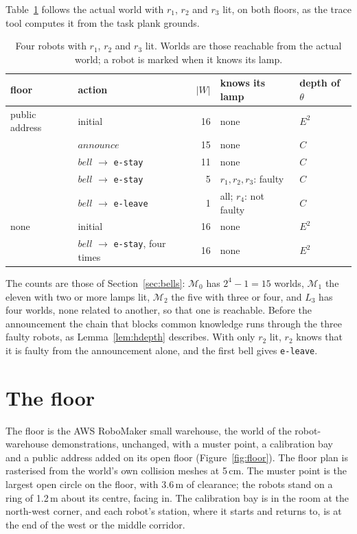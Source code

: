 \documentclass[11pt,a4paper]{article}
\theoremstyle{definition}
\newcommand{\Mod}{\mathcal{M}}
\newcommand{\code}[1]{\texttt{\small #1}}
\newcommand{\some}{\theta}
\begin{document}
Table~\ref{tab:trace} follows the actual world with $r_1$, $r_2$ and $r_3$ lit,
on both floors, as the trace tool computes it from the task plank grounds.

\begin{table}[H]
\centering\small
\caption{Four robots with $r_1$, $r_2$ and $r_3$ lit. Worlds are those
reachable from the actual world; a robot is marked when it knows its lamp.}
\label{tab:trace}
\begin{tabular}{@{}l l r l l@{}}
\toprule
floor & action & $|W|$ & knows its lamp & depth of $\some$ \\
\midrule
public address & initial & 16 & none & $E^2$ \\
 & $\mathit{announce}$ & 15 & none & $C$ \\
 & $\mathit{bell}$ $\to$ \code{e-stay} & 11 & none & $C$ \\
 & $\mathit{bell}$ $\to$ \code{e-stay} & 5 & $r_1, r_2, r_3$: faulty & $C$ \\
 & $\mathit{bell}$ $\to$ \code{e-leave} & 1 & all; $r_4$: not faulty & $C$ \\
\midrule
none & initial & 16 & none & $E^2$ \\
 & $\mathit{bell}$ $\to$ \code{e-stay}, four times & 16 & none & $E^2$ \\
\bottomrule
\end{tabular}
\end{table}

\noindent
The counts are those of Section~\ref{sec:bells}: $\Mod_0$ has $2^4 - 1 = 15$
worlds, $\Mod_1$ the eleven with two or more lamps lit, $\Mod_2$ the five with
three or four, and $L_3$ has four worlds, none related to another, so that one
is reachable. Before the announcement the chain that blocks common knowledge
runs through the three faulty robots, as Lemma~\ref{lem:hdepth} describes. With
only $r_2$ lit, $r_2$ knows that it is faulty from the announcement alone, and
the first bell gives \code{e-leave}.

\section{The floor}
\label{sec:floor}

The floor is the AWS RoboMaker small warehouse, the world of the robot-warehouse
demonstrations, unchanged, with a muster point, a calibration bay and a public
address added on its open floor (Figure~\ref{fig:floor}). The floor plan is
rasterised from the world's own collision meshes at 5\,cm. The muster point is
the largest open circle on the floor, with 3.6\,m of clearance; the robots stand
on a ring of 1.2\,m about its centre, facing in. The calibration bay is in the
room at the north-west corner, and each robot's station, where it starts and
returns to, is at the end of the west or the middle corridor.
\end{document}
